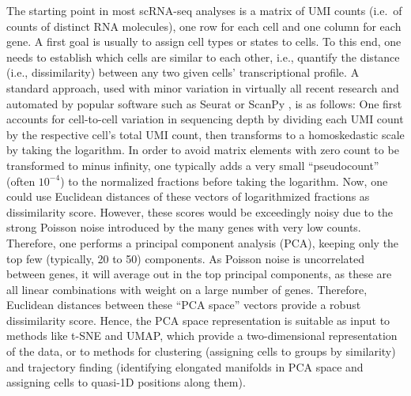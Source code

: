 \documentclass[twocolumn,10pt]{article}
\begin{document}
The starting point in most scRNA-seq analyses is a matrix of UMI counts (i.e.\ of counts of distinct RNA molecules), one row for each cell and one column for each gene.
A first goal is usually to assign cell types or states to cells.
To this end, one needs to establish which cells are similar to each other, i.e., quantify the distance (i.e., dissimilarity) between any two given cells' transcriptional profile.
A standard approach, used with minor variation in virtually all recent research and automated by popular software such as Seurat \citep{Hao_2021} or ScanPy \citep{Wolf_2018}, is as follows:
One first accounts for cell-to-cell variation in sequencing depth by dividing each UMI count by the respective cell's total UMI count, then transforms to a homoskedastic scale by taking the logarithm.
In order to avoid matrix elements with zero count to be transformed to minus infinity, one typically adds a very small ``pseudocount'' (often $10^{-4}$) to the normalized fractions before taking the logarithm.
Now, one could use Euclidean distances of these vectors of logarithmized fractions as dissimilarity score.
However, these scores would be exceedingly noisy due to the strong Poisson noise introduced by the many genes with very low counts.
Therefore, one performs a principal component analysis (PCA), keeping only the top few (typically, 20 to 50) components.
As Poisson noise is uncorrelated between genes, it will average out in the top principal components, as these are all linear combinations with weight on a large number of genes.
Therefore, Euclidean distances between these ``PCA space'' vectors provide a robust dissimilarity score.
Hence, the PCA space representation is suitable as input to methods like t-SNE and UMAP, which provide a two-dimensional representation of the data, or to methods for clustering (assigning cells to groups by similarity) and trajectory finding (identifying elongated manifolds in PCA space and assigning cells to quasi-1D positions along them).
\end{document}
